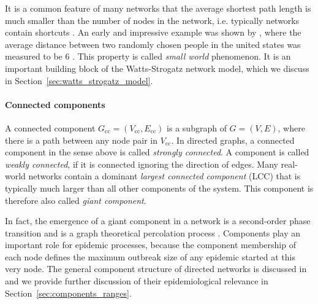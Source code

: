 It is a common feature of many networks that the average shortest path length is much smaller than the number of nodes in the network, i.e. typically networks contain shortcuts \citep{RevModPhys.74}.
An early and impressive example was shown by \citeauthor{Milgram:1967}, where the average distance between two randomly chosen people in the united states was measured to be 6 \citep{Milgram:1967}. 
This property is called \emph{small world} phenomenon.
It is an important building block of the Watts-Strogatz network model, which we discuss in Section~\ref{sec:watts_strogatz_model}.

\paragraph{Connected components\color{Cayenne}{.}}
A connected component $G_\mathrm{cc}=(V_\mathrm{cc},E_\mathrm{cc})$ is a subgraph of $G=(V,E)$, where there is a path between any node pair in $V_\mathrm{cc}$.
In directed graphs, a connected component in the sense above is called \emph{strongly connected}.
A component is called \emph{weakly connected}, if it is connected ignoring the direction of edges.
Many real-world networks contain a dominant \emph{largest connected component} (LCC) that is typically much larger than all other components of the system.
This component is therefore also called \emph{giant component}.

In fact, the emergence of a giant component in a network is a second-order phase transition and is a graph theoretical percolation process \citep{Newman2003}. 
Components play an important role for epidemic processes, because the component membership of each node defines the maximum outbreak size of any epidemic started at this very node.
The general component structure of directed networks is discussed in \citep{Dorogovtsev:2001jd} and we provide further discussion of their epidemiological relevance in Section~\ref{sec:components_ranges}.

